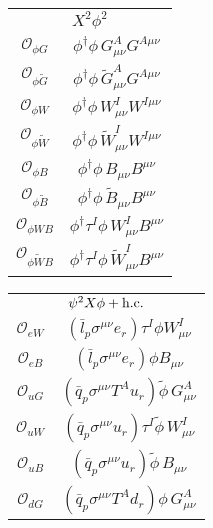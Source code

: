 \begin{table}
\begin{center}
		\vspace{0.25cm}
				\hspace{-2.7 cm}
		\begin{minipage}[t]{4.6cm}
			\renewcommand{\arraystretch}{1.5}
			\begin{tabular}[t]{c|c}
				\multicolumn{2}{c}{$X^2\phi^2$} \\
				\toplinetwo
				$\mathcal{O}_{\phi G}$     & $\phi^\dag \phi\, G^A_{\mu\nu} G^{A\mu\nu}$ \\
				$\mathcal{O}_{\phi\widetilde G}$         & $\phi^\dag \phi\, \widetilde G^A_{\mu\nu} G^{A\mu\nu}$ \\
				$\mathcal{O}_{\phi W}$     & $\phi^\dag \phi\, W^I_{\mu\nu} W^{I\mu\nu}$ \\
				$\mathcal{O}_{\phi\widetilde W}$         & $\phi^\dag \phi\, \widetilde W^I_{\mu\nu} W^{I\mu\nu}$ \\
				$\mathcal{O}_{\phi B}$     & $ \phi^\dag \phi\, B_{\mu\nu} B^{\mu\nu}$ \\
				$\mathcal{O}_{\phi\widetilde B}$         & $\phi^\dag \phi\, \widetilde B_{\mu\nu} B^{\mu\nu}$ \\
				$\mathcal{O}_{\phi WB}$     & $ \phi^\dag \tau^I \phi\, W^I_{\mu\nu} B^{\mu\nu}$ \\
				$\mathcal{O}_{\phi\widetilde W B}$         & $\phi^\dag \tau^I \phi\, \widetilde W^I_{\mu\nu} B^{\mu\nu}$ 
			\end{tabular}
		\end{minipage}
		\begin{minipage}[t]{4.6cm}
			\renewcommand{\arraystretch}{1.5}
			\begin{tabular}[t]{c|c}
				\multicolumn{2}{c}{$\psi^2 X\phi+\hbox{h.c.}$} \\
				\toplinetwo
				$\mathcal{O}_{eW}$      & $(\bar l_p \sigma^{\mu\nu} e_r) \tau^I \phi W_{\mu\nu}^I$ \\
				$\mathcal{O}_{eB}$        & $(\bar l_p \sigma^{\mu\nu} e_r) \phi B_{\mu\nu}$ \\
				$\mathcal{O}_{uG}$        & $(\bar q_p \sigma^{\mu\nu} T^A u_r) \widetilde \phi \, G_{\mu\nu}^A$ \\
				$\mathcal{O}_{uW}$        & $(\bar q_p \sigma^{\mu\nu} u_r) \tau^I \widetilde \phi \, W_{\mu\nu}^I$ \\
				$\mathcal{O}_{uB}$        & $(\bar q_p \sigma^{\mu\nu} u_r) \widetilde \phi \, B_{\mu\nu}$ \\
				$\mathcal{O}_{dG}$        & $(\bar q_p \sigma^{\mu\nu} T^A d_r) \phi\, G_{\mu\nu}^A$ \\

\end{tabular}
\end{minipage}
\end{center}
\end{table}
